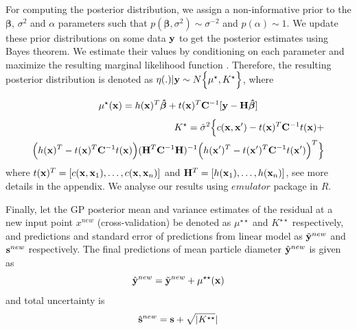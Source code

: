 \documentclass[12pt,titlepage]{report}
\newcommand{\bH}{{\bf H}}
\newcommand{\bC}{{\bf C}}
\newcommand{\bx}{{\bf x}}
\newcommand{\by}{{\bf y}}
\newcommand{\tby}{{\tilde {\bf y}}}
\newcommand{\hby}{{\hat {\bf y}}}
\newcommand{\bs}{{\bf s}}
\newcommand{\bbeta}{{\boldsymbol{\beta}}}
\theoremstyle{definition}
\theoremstyle{remark}
\begin{document}
For computing the posterior distribution, we assign a non-informative prior to the $\boldsymbol \beta$, $\sigma^2$ and $\alpha$ parameters such that $p(\bbeta, \sigma^2) \sim \sigma^{-2}$ and $p(\alpha) \sim 1$.
We update these prior distributions on some data $\by$ to get the posterior estimates using Bayes theorem. We estimate their values by conditioning on each parameter and maximize the resulting marginal likelihood function \citep{pd7,pd10}. Therefore, the resulting posterior distribution is denoted as $\eta(.)|\by \sim N\Big \{\mu^{\star}, K^{\star} \Big\}$, where

\begin{equation}\label{olu1}%
\mu^{\star}(\mathbf{x})=h(\mathbf{x})^T\boldsymbol{\hat\beta}+t(\mathbf{x})^T\bC^{-1}[\by-\bH\boldsymbol{\hat\beta}]
\end{equation}
\begin{multline}\label{olu2}%
\begin{split}
K^{\star}=\hat \sigma^2 \Big \{c(\mathbf{x,x'}) -t(\mathbf{x})^T\bC^{-1} t(\mathbf{x}) + \\ \Big ( h(\mathbf{x})^T-t(\mathbf{x})^T\bC^{-1}t(\mathbf{x}) \Big )
(\bH^T\bC^{-1}\bH)^{-1}\Big ( h(\mathbf{x'})^T-t(\mathbf{x'})^T\bC^{-1}t(\mathbf{x'}) \Big )^T
\Big \}
\end{split}
\end{multline}
where $t(\bx)^T=[c(\bx,\bx_1),\ldots, c(\bx,\bx_n)]$ and $\bH^T=[h(\bx_1),\ldots, h(\bx_n)]$, see more details in the appendix. We analyse our results using $emulator$ package in $R$.

Finally, let the GP posterior mean and variance estimates of the residual at a new input point $x^{new}$ (cross-validation) be denoted as $\mu^{\star \star}$ and $K^{\star \star}$ respectively, and predictions and standard error of predictions from linear model as $\tby^{new}$ and $\bs^{new}$ respectively. The final predictions of mean particle diameter $\hby^{new}$ is given as
\begin{equation}\label{r1}
\hby^{new} = \tby^{new} +\mu^{\star \star}(\bx)
\end{equation}
and total uncertainty is
\begin{equation}\label{r1}
\hat \bs^{new} = \bs +\sqrt{|K^{\star \star}}|
\end{equation}
\end{document}
